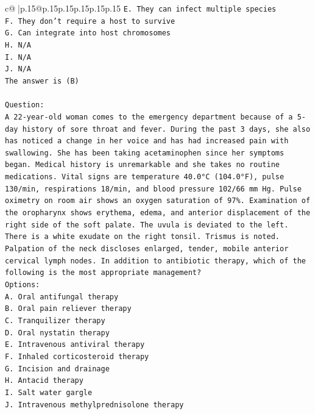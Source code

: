 \documentclass{article}
\begin{document}
{\begin{supertabular}{c@{$\;$}|p{.15\linewidth}@{}p{.15\linewidth}p{.15\linewidth}p{.15\linewidth}p{.15\linewidth}p{.15\linewidth}}
{{{\texttt{E. They can infect multiple species} \\
\texttt{F. They don't require a host to survive} \\
\texttt{G. Can integrate into host chromosomes} \\
\texttt{H. N/A} \\
\texttt{I. N/A} \\
\texttt{J. N/A} \\
\texttt{The answer is (B)} \\
\\ 
\texttt{Question:} \\
\texttt{A 22{-}year{-}old woman comes to the emergency department because of a 5{-}day history of sore throat and fever. During the past 3 days, she also has noticed a change in her voice and has had increased pain with swallowing. She has been taking acetaminophen since her symptoms began. Medical history is unremarkable and she takes no routine medications. Vital signs are temperature 40.0°C (104.0°F), pulse 130/min, respirations 18/min, and blood pressure 102/66 mm Hg. Pulse oximetry on room air shows an oxygen saturation of 97\%. Examination of the oropharynx shows erythema, edema, and anterior displacement of the right side of the soft palate. The uvula is deviated to the left. There is a white exudate on the right tonsil. Trismus is noted. Palpation of the neck discloses enlarged, tender, mobile anterior cervical lymph nodes. In addition to antibiotic therapy, which of the following is the most appropriate management? } \\
\texttt{Options:} \\
\texttt{A. Oral antifungal therapy} \\
\texttt{B. Oral pain reliever therapy} \\
\texttt{C. Tranquilizer therapy} \\
\texttt{D. Oral nystatin therapy} \\
\texttt{E. Intravenous antiviral therapy} \\
\texttt{F. Inhaled corticosteroid therapy} \\
\texttt{G. Incision and drainage} \\
\texttt{H. Antacid therapy} \\
\texttt{I. Salt water gargle} \\
\texttt{J. Intravenous methylprednisolone therapy} \\
            }
        }
    }
     \\ \\


\end{supertabular}}
\end{document}
